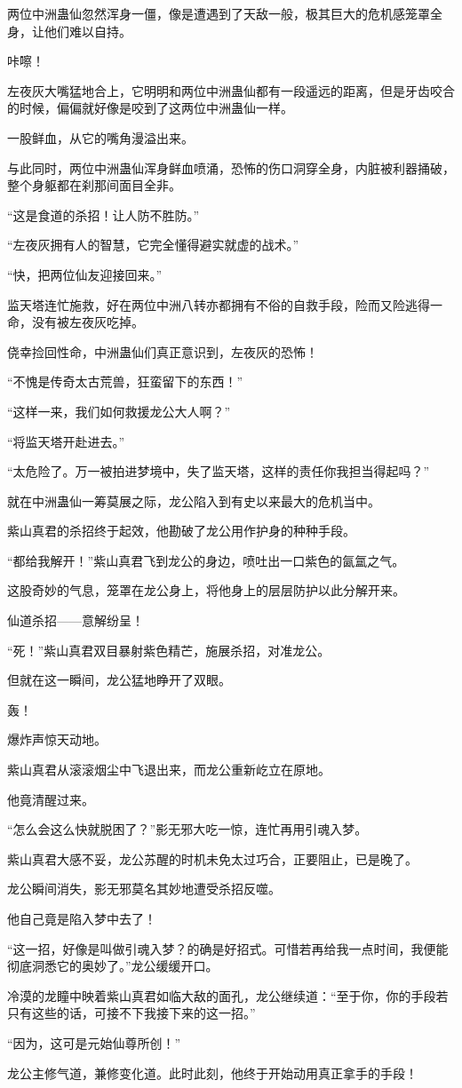 \begin{this_body}
两位中洲蛊仙忽然浑身一僵，像是遭遇到了天敌一般，极其巨大的危机感笼罩全身，让他们难以自持。

咔嚓！

左夜灰大嘴猛地合上，它明明和两位中洲蛊仙都有一段遥远的距离，但是牙齿咬合的时候，偏偏就好像是咬到了这两位中洲蛊仙一样。

一股鲜血，从它的嘴角漫溢出来。

与此同时，两位中洲蛊仙浑身鲜血喷涌，恐怖的伤口洞穿全身，内脏被利器捅破，整个身躯都在刹那间面目全非。

“这是食道的杀招！让人防不胜防。”

“左夜灰拥有人的智慧，它完全懂得避实就虚的战术。”

“快，把两位仙友迎接回来。”

监天塔连忙施救，好在两位中洲八转亦都拥有不俗的自救手段，险而又险逃得一命，没有被左夜灰吃掉。

侥幸捡回性命，中洲蛊仙们真正意识到，左夜灰的恐怖！

“不愧是传奇太古荒兽，狂蛮留下的东西！”

“这样一来，我们如何救援龙公大人啊？”

“将监天塔开赴进去。”

“太危险了。万一被拍进梦境中，失了监天塔，这样的责任你我担当得起吗？”

就在中洲蛊仙一筹莫展之际，龙公陷入到有史以来最大的危机当中。

紫山真君的杀招终于起效，他勘破了龙公用作护身的种种手段。

“都给我解开！”紫山真君飞到龙公的身边，喷吐出一口紫色的氤氲之气。

这股奇妙的气息，笼罩在龙公身上，将他身上的层层防护以此分解开来。

仙道杀招——意解纷呈！

“死！”紫山真君双目暴射紫色精芒，施展杀招，对准龙公。

但就在这一瞬间，龙公猛地睁开了双眼。

轰！

爆炸声惊天动地。

紫山真君从滚滚烟尘中飞退出来，而龙公重新屹立在原地。

他竟清醒过来。

“怎么会这么快就脱困了？”影无邪大吃一惊，连忙再用引魂入梦。

紫山真君大感不妥，龙公苏醒的时机未免太过巧合，正要阻止，已是晚了。

龙公瞬间消失，影无邪莫名其妙地遭受杀招反噬。

他自己竟是陷入梦中去了！

“这一招，好像是叫做引魂入梦？的确是好招式。可惜若再给我一点时间，我便能彻底洞悉它的奥妙了。”龙公缓缓开口。

冷漠的龙瞳中映着紫山真君如临大敌的面孔，龙公继续道：“至于你，你的手段若只有这些的话，可接不下我接下来的这一招。”

“因为，这可是元始仙尊所创！”

龙公主修气道，兼修变化道。此时此刻，他终于开始动用真正拿手的手段！

\end{this_body}

